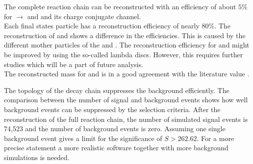The complete reaction chain can be reconstructed with an efficiency of about $5\%$ for \pbarpSystem $\rightarrow$ \excitedcascade and \anticascade and its
charge conjugate channel.\\
Each final states particle has a reconstruction efficiency of nearly $80\%$.
The reconstruction of \lam and \alam shows a difference in the efficiencies.
This is caused by the different mother particles of the \lam and \alam. 
The reconstruction efficiency for \lam and \alam might be improved by using the so-called lambda discs.
However, this requires further studies which will be a part of future analysis.\\
The reconstructed mass for \excitedcascade and \excitedanticascade is in a good agreement with the literature value \cite{PDG}.

The topology of the decay chain suppresses the background efficiently.
The comparison between the number of signal and background events shows how well background events can be suppressed by the selection criteria.
After the reconstruction of the full reaction chain, the number of simulated signal events is 74,523 and the number of background events is zero. 
Assuming one single background event gives a limit for the significance of $S>262.62$.
For a more precise statement a more realistic software together with more background simulations is needed. 

 
  


